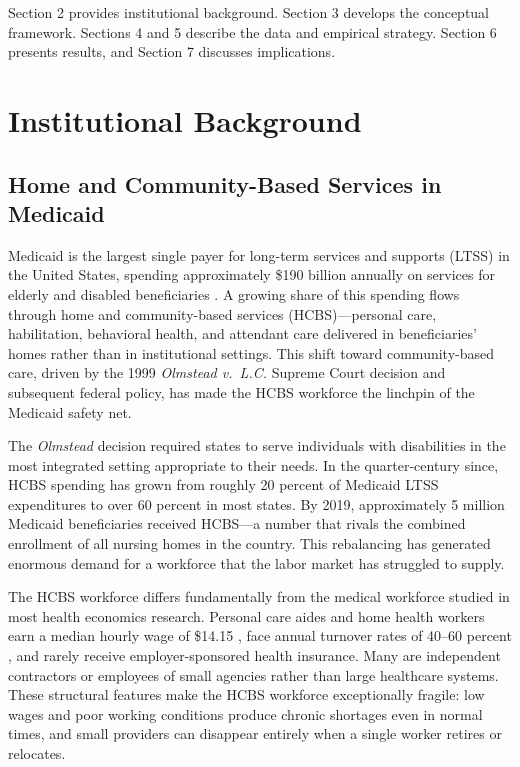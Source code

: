 \documentclass[12pt]{article}
\begin{document}
Section 2 provides institutional background. Section 3 develops the conceptual framework. Sections 4 and 5 describe the data and empirical strategy. Section 6 presents results, and Section 7 discusses implications.


\section{Institutional Background}

\subsection{Home and Community-Based Services in Medicaid}

Medicaid is the largest single payer for long-term services and supports (LTSS) in the United States, spending approximately \$190 billion annually on services for elderly and disabled beneficiaries \citep{cms2024medicaid}. A growing share of this spending flows through home and community-based services (HCBS)---personal care, habilitation, behavioral health, and attendant care delivered in beneficiaries' homes rather than in institutional settings. This shift toward community-based care, driven by the 1999 \emph{Olmstead v.\ L.C.} Supreme Court decision and subsequent federal policy, has made the HCBS workforce the linchpin of the Medicaid safety net.

The \emph{Olmstead} decision required states to serve individuals with disabilities in the most integrated setting appropriate to their needs. In the quarter-century since, HCBS spending has grown from roughly 20 percent of Medicaid LTSS expenditures to over 60 percent in most states. By 2019, approximately 5 million Medicaid beneficiaries received HCBS---a number that rivals the combined enrollment of all nursing homes in the country. This rebalancing has generated enormous demand for a workforce that the labor market has struggled to supply.

The HCBS workforce differs fundamentally from the medical workforce studied in most health economics research. Personal care aides and home health workers earn a median hourly wage of \$14.15 \citep{bls2023hcbs}, face annual turnover rates of 40--60 percent \citep{phi2023turnover}, and rarely receive employer-sponsored health insurance. Many are independent contractors or employees of small agencies rather than large healthcare systems. These structural features make the HCBS workforce exceptionally fragile: low wages and poor working conditions produce chronic shortages even in normal times, and small providers can disappear entirely when a single worker retires or relocates.
\end{document}
